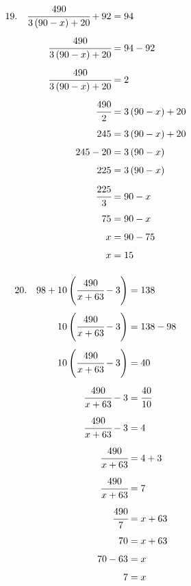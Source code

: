 \documentclass{article}
\begin{document}
\noindent
\begin{minipage}[t]{0.5000\textwidth}
\begin{align*}
19.\hspace{10pt}\cfrac{490}{3\left(90-x\right)+20}+92&=94\\[4pt]
\cfrac{490}{3\left(90-x\right)+20}&=94-92\\[4pt]
\cfrac{490}{3\left(90-x\right)+20}&=2\\[4pt]
\cfrac{490}{2}&=3\left(90-x\right)+20\\[4pt]
245&=3\left(90-x\right)+20\\[4pt]
245-20&=3\left(90-x\right)\\[4pt]
225&=3\left(90-x\right)\\[4pt]
\cfrac{225}{3}&=90-x\\[4pt]
75&=90-x\\[4pt]
x&=90-75\\[4pt]
x&=15\\[4pt]
\end{align*}
\end{minipage}
\begin{minipage}[t]{0.5000\textwidth}
\begin{align*}
20.\hspace{10pt}98+10\left(\cfrac{490}{x+63}-3\right)&=138\\[4pt]
10\left(\cfrac{490}{x+63}-3\right)&=138-98\\[4pt]
10\left(\cfrac{490}{x+63}-3\right)&=40\\[4pt]
\cfrac{490}{x+63}-3&=\cfrac{40}{10}\\[4pt]
\cfrac{490}{x+63}-3&=4\\[4pt]
\cfrac{490}{x+63}&=4+3\\[4pt]
\cfrac{490}{x+63}&=7\\[4pt]
\cfrac{490}{7}&=x+63\\[4pt]
70&=x+63\\[4pt]
70-63&=x\\[4pt]
7&=x\\[4pt]
\end{align*}
\end{minipage}
\end{document}
